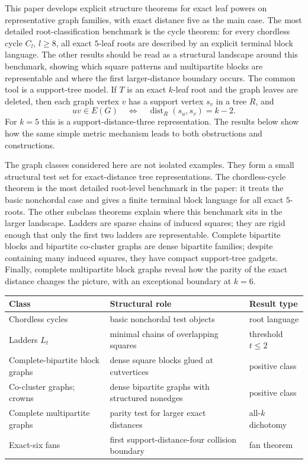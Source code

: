 \documentclass[11pt]{article}
\theoremstyle{definition}
\newcommand{\dist}{\operatorname{dist}}
\begin{document}
This paper develops explicit structure theorems for exact leaf powers on representative graph families, with exact distance five as the main case.  The most detailed root-classification benchmark is the cycle theorem: for every chordless cycle $C_l$, $l\ge8$, all exact $5$-leaf roots are described by an explicit terminal block language.  The other results should be read as a structural landscape around this benchmark, showing which square patterns and multipartite blocks are representable and where the first larger-distance boundary occurs.  The common tool is a support-tree model.  If $T$ is an exact $k$-leaf root and the graph leaves are deleted, then each graph vertex $v$ has a support vertex $s_v$ in a tree $R$, and
\[
 uv\in E(G)\quad\Longleftrightarrow\quad \dist_R(s_u,s_v)=k-2.
\]
For $k=5$ this is a support-distance-three representation.  The results below show how the same simple metric mechanism leads to both obstructions and constructions.

The graph classes considered here are not isolated examples.  They form a small structural test set for exact-distance tree representations.  The chordless-cycle theorem is the most detailed root-level benchmark in the paper: it treats the basic nonchordal case and gives a finite terminal block language for all exact $5$-roots.  The other subclass theorems explain where this benchmark sits in the larger landscape.  Ladders are sparse chains of induced squares; they are rigid enough that only the first two ladders are representable.  Complete bipartite blocks and bipartite co-cluster graphs are dense bipartite families; despite containing many induced squares, they have compact support-tree gadgets.  Finally, complete multipartite block graphs reveal how the parity of the exact distance changes the picture, with an exceptional boundary at $k=6$.

\begin{center}
\small
\renewcommand{\arraystretch}{1.08}
\begin{tabular}{@{}>{\raggedright\arraybackslash}p{}>{\raggedright\arraybackslash}p{}>{\raggedright\arraybackslash}p{}@{}}
\hline
Class & Structural role & Result type \\
\hline
Chordless cycles & basic nonchordal test objects & root language \\
Ladders $L_t$ & minimal chains of overlapping squares & threshold $t\le2$ \\
Complete-bipartite block graphs & dense square blocks glued at cutvertices & positive class \\
Co-cluster graphs; crowns & dense bipartite graphs with structured nonedges & positive class \\
Complete multipartite graphs & parity test for larger exact distances & all-$k$ dichotomy \\
Exact-six fans & first support-distance-four collision boundary & fan theorem \\
\hline

\end{tabular}
\end{center}
\end{document}
